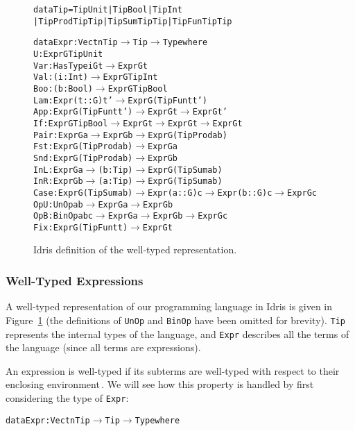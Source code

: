 \begin{figure}
\begin{alltt}
  data Tip = TipUnit | TipBool | TipInt 
           | TipProd Tip Tip | TipSum Tip Tip | TipFun Tip Tip

  data Expr : Vect n Tip \(\rightarrow\) Tip \(\rightarrow\) Type where
    U    : Expr G TipUnit
    Var  : HasType i G t \(\rightarrow\) Expr G t
    Val  : (i : Int) \(\rightarrow\) Expr G TipInt
    Boo  : (b : Bool) \(\rightarrow\) Expr G TipBool
    Lam  : Expr (t :: G) t' \(\rightarrow\) Expr G (TipFun t t')
    App  : Expr G (TipFun t t') \(\rightarrow\) Expr G t \(\rightarrow\) Expr G t'
    If   : Expr G TipBool \(\rightarrow\) Expr G t \(\rightarrow\) Expr G t \(\rightarrow\) Expr G t
    Pair : Expr G a \(\rightarrow\) Expr G b \(\rightarrow\) Expr G (TipProd a b)
    Fst  : Expr G (TipProd a b) \(\rightarrow\) Expr G a
    Snd  : Expr G (TipProd a b) \(\rightarrow\) Expr G b
    InL  : Expr G a \(\rightarrow\) (b: Tip) \(\rightarrow\) Expr G (TipSum a b)
    InR  : Expr G b \(\rightarrow\) (a: Tip) \(\rightarrow\) Expr G (TipSum a b)
    Case : Expr G (TipSum a b) \(\rightarrow\) Expr (a :: G) c \(\rightarrow\) Expr (b :: G) c \(\rightarrow\) Expr G c
    OpU  : UnOp a b \(\rightarrow\) Expr G a \(\rightarrow\) Expr G b
    OpB  : BinOp a b c \(\rightarrow\) Expr G a \(\rightarrow\) Expr G b \(\rightarrow\) Expr G c
    Fix  : Expr G (TipFun t t) \(\rightarrow\) Expr G t
\end{alltt}
\caption{Idris definition of the well-typed representation.}
\label{fig:idris-def-expr-lang}
\end{figure}


\subsubsection{Well-Typed Expressions}
A well-typed representation of our programming language in Idris is given in Figure~\ref{fig:idris-def-expr-lang} (the definitions of \texttt{UnOp} and \texttt{BinOp} have been omitted for brevity). \texttt{Tip} represents the internal types of the language, and \texttt{Expr} describes all the terms of the language (since all terms are expressions).

An expression is well-typed if its subterms are well-typed with respect to their enclosing environment\,\cite{Milner78atheory}. We will see how this property is handled by first considering the type of \texttt{Expr}:

\begin{alltt}
  data Expr : Vect n Tip \(\rightarrow\) Tip \(\rightarrow\) Type where
\end{alltt}

